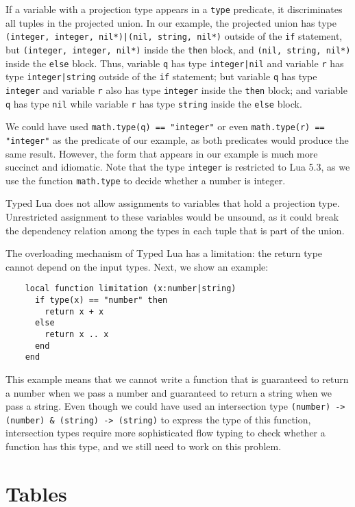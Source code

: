 If a variable with a projection type appears in a \texttt{type} predicate,
it discriminates all tuples in the projected union.
In our example, the projected union has type
\texttt{(integer, integer, nil*)|(nil, string, nil*)} outside of the
\texttt{if} statement,
but \texttt{(integer, integer, nil*)} inside the \texttt{then} block,
and \texttt{(nil, string, nil*)} inside the \texttt{else} block.
Thus, variable \texttt{q} has type \texttt{integer|nil} and variable
\texttt{r} has type \texttt{integer|string} outside of the
\texttt{if} statement;
but variable \texttt{q} has type \texttt{integer} and variable \texttt{r} also
has type \texttt{integer} inside the \texttt{then} block;
and variable \texttt{q} has type \texttt{nil} while variable \texttt{r}
has type \texttt{string} inside the \texttt{else} block.

We could have used \texttt{math.type(q) == "integer"} or
even \texttt{math.type(r) == "integer"} as the predicate of our example,
as both predicates would produce the same result.
However, the form that appears in our example is much more succinct and idiomatic.
Note that the type \texttt{integer} is restricted to Lua 5.3,
as we use the function \texttt{math.type} to decide whether a number is integer.

Typed Lua does not allow assignments to variables that hold a projection type.
Unrestricted assignment to these variables would be unsound,
as it could break the dependency relation among the types in each tuple
that is part of the union.

The overloading mechanism of Typed Lua has a limitation:
the return type cannot depend on the input types.
Next, we show an example:
\begin{verbatim}
    local function limitation (x:number|string)
      if type(x) == "number" then
        return x + x
      else
        return x .. x
      end
    end
\end{verbatim}

This example means that we cannot write a function that is
guaranteed to return a number when we pass a number and
guaranteed to return a string when we pass a string.
Even though we could have used an intersection type
\texttt{(number) -> (number) \string& (string) -> (string)}
to express the type of this function,
intersection types require more sophisticated flow typing to
check whether a function has this type,
and we still need to work on this problem.

\section{Tables}
\label{sec:tables}

